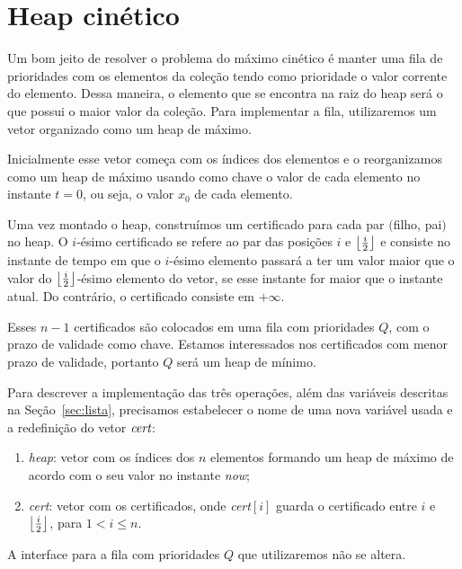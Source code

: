

\section{Heap cinético}\label{sec:heap-cinetico}
Um bom jeito de resolver o problema do máximo cinético é manter uma fila de
prioridades com os elementos da coleção tendo como prioridade o valor corrente
do elemento.
Dessa maneira, o elemento que se encontra na raiz do heap será o que possui o maior valor da
coleção.
Para implementar a fila, utilizaremos um vetor organizado como um heap de máximo.

Inicialmente esse vetor começa com os índices dos elementos e o reorganizamos como um
heap de máximo usando como chave o valor de cada elemento no instante $t = 0$, ou seja, o
valor $x_0$ de cada elemento.

Uma vez montado o heap, construímos um certificado para cada par $($filho,
pai$)$ no heap.
O $i$-ésimo certificado se refere ao par das posições $i$ e $\left\lfloor \frac{i}{2} \right\rfloor$ e consiste no
instante de tempo em que o $i$-ésimo elemento passará a ter um valor maior que o valor do
$\left\lfloor \frac{i}{2} \right\rfloor$-ésimo elemento do vetor, se esse instante for maior que o instante atual.
Do contrário, o certificado consiste em $+\infty$.

Esses $n - 1$ certificados são colocados em uma fila com prioridades $Q$, com o
prazo de validade como chave.
Estamos interessados nos certificados com menor prazo de validade, portanto $Q$ será um heap de
mínimo.

Para descrever a implementação das três operações, além das variáveis descritas na
Seção~\ref{sec:lista}, precisamos estabelecer o nome de uma nova variável usada e a redefinição do
vetor $\textit{cert}$:
\begin{enumerate}
    \item \textit{heap}: vetor com os índices dos $n$ elementos
    formando um heap de máximo de acordo com o seu valor no instante
    \textit{now};
    \item \textit{cert}: vetor com os certificados, onde
    \textit{cert}$[i]$ guarda o certificado entre $i$ e
    $\left\lfloor \frac{i}{2} \right\rfloor$, para $1 < i \leq n$.
\end{enumerate}

A interface para a fila com prioridades $Q$ que utilizaremos não se altera.

